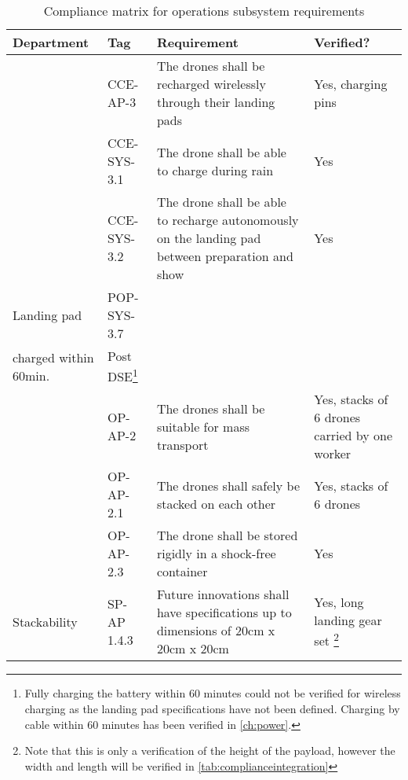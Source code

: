 \begin{longtable}[c]{|p{2cm}|p{2.2cm}|p{8.2cm}|p{2cm}|}
\caption{Compliance matrix for operations subsystem requirements}
\label{tab:complianceops}\\
\hline
\textbf{Department} & \textbf{Tag} & \textbf{Requirement} & \textbf{Verified?} \\ \hline
\endfirsthead
%
\endhead
%
 & CCE-AP-3 & The drones shall be recharged wirelessly through their landing pads & \cellcolor[HTML]{C1FFC1}Yes, charging pins \\ \cline{2-4} 
 & CCE-SYS-3.1 & The drone shall be able to charge during rain & \cellcolor[HTML]{C1FFC1}Yes \\ \cline{2-4} 
 & CCE-SYS-3.2 & The drone shall be able to recharge autonomously on the landing pad between preparation and show & \cellcolor[HTML]{C1FFC1}Yes \\ \cline{2-4} 
\multirow{-5}{*}{Landing pad} & POP-SYS-3.7 & \begin{tabular}[c]{@{}l@{}}The energy storage should be fully \\    charged within 60min.\end{tabular} & \cellcolor[HTML]{DDEBF7}Post DSE\footnote{Fully charging the battery within 60 minutes could not be verified for wireless charging as the landing pad specifications have not been defined. Charging by cable within 60 minutes has been verified in \autoref{ch:power}.} \\ \hline
 & OP-AP-2 & The drones shall be suitable for mass transport & \cellcolor[HTML]{C1FFC1}Yes, stacks of 6 drones carried by one worker \\ \cline{2-4} 
 & OP-AP-2.1 & The drones shall safely be stacked on each other & \cellcolor[HTML]{C1FFC1}Yes, stacks of 6 drones \\ \cline{2-4} 
 & OP-AP-2.3 & The drone shall be stored rigidly in a shock-free container & \cellcolor[HTML]{C1FFC1}Yes \\ \cline{2-4} 
\multirow{-5}{*}{Stackability} & SP-AP 1.4.3 & Future innovations shall have specifications up to dimensions of 20cm x 20cm x 20cm & \cellcolor[HTML]{C1FFC1}Yes, long landing gear set \footnote{Note that this is only a verification of the height of the payload, however the width and length will be verified in \autoref{tab:complianceintegration}} \\ \hline
\end{longtable}






